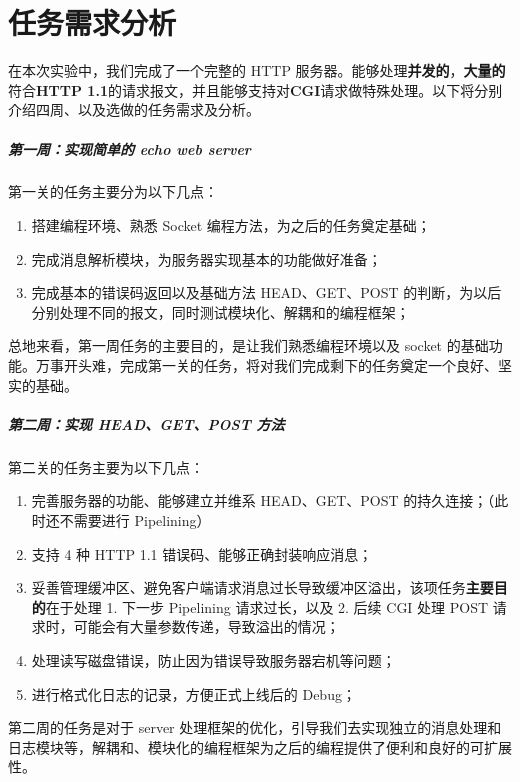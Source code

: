 
\chapter{任务需求分析}

在本次实验中，我们完成了一个完整的 HTTP 服务器。能够处理\textbf{并发的}，\textbf{大量的}符合\textbf{HTTP 1.1}的请求报文，并且能够支持对\textbf{CGI}请求做特殊处理。以下将分别介绍四周、以及选做的任务需求及分析。

\paragraph*{第一周：实现简单的 echo web server} 第一关的任务主要分为以下几点：
\begin{enumerate}
    \item 搭建编程环境、熟悉 Socket 编程方法，为之后的任务奠定基础；
    \item 完成消息解析模块，为服务器实现基本的功能做好准备；
    \item 完成基本的错误码返回以及基础方法 HEAD、GET、POST 的判断，为以后分别处理不同的报文，同时测试模块化、解耦和的编程框架；
\end{enumerate}
    

总地来看，第一周任务的主要目的，是让我们熟悉编程环境以及 socket 的基础功能。万事开头难，完成第一关的任务，将对我们完成剩下的任务奠定一个良好、坚实的基础。

\paragraph*{第二周：实现 HEAD、GET、POST 方法} 第二关的任务主要为以下几点：
\begin{enumerate}
    \item 完善服务器的功能、能够建立并维系 HEAD、GET、POST 的持久连接；（此时还不需要进行 Pipelining）
    \item 支持 4 种 HTTP 1.1 错误码、能够正确封装响应消息；
    \item 妥善管理缓冲区、避免客户端请求消息过长导致缓冲区溢出，该项任务\textbf{主要目的}在于处理 1. 下一步 Pipelining 请求过长，以及 2. 后续 CGI 处理 POST 请求时，可能会有大量参数传递，导致溢出的情况；
    \item 处理读写磁盘错误，防止因为错误导致服务器宕机等问题；
    \item 进行格式化日志的记录，方便正式上线后的 Debug；
\end{enumerate}

第二周的任务是对于 server 处理框架的优化，引导我们去实现独立的消息处理和日志模块等，解耦和、模块化的编程框架为之后的编程提供了便利和良好的可扩展性。

